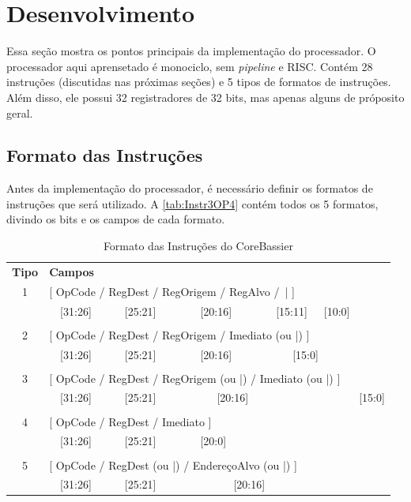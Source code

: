 \documentclass[
	12pt,
	openright,
	a4paper,
	english,			
	french,				
	spanish,			
	brazil,				
	]{abntex2}
\begin{document}
\chapter{Desenvolvimento}
Essa seção mostra os pontos principais da implementação do processador. O processador aqui aprensetado é monociclo, sem \textit{pipeline} e RISC. Contém 28 instruções (discutidas nas próximas seções) e 5 tipos de formatos de instruções.\\
Além disso, ele possui 32 registradores de 32 bits, mas apenas alguns de próposito geral.

\section{Formato das Instruções}
Antes da implementação do processador, é necessário definir os formatos de instruções que será utilizado. A \autoref{tab:Instr3OP4} contém todos os 5 formatos, divindo os bits e os campos de cada formato.
\begin{table}[htb]
\centering
\ABNTEXfontereduzida
\caption{Formato das Instruções do CoreBassier} \label{tab:Instr3OP4}
\begin{tabular}{cl} 
	\textbf{Tipo} & \textbf{Campos}\\
	1 & [ OpCode / RegDest / RegOrigem / RegAlvo /\ | ]\\
	  &  \ \ [31:26]\ \ \ \ \ \ [25:21]\ \ \ \ \ \ \ \ [20:16]\ \ \ \ \ \ \ \ [15:11]\ \ \ [10:0]\\
	\hline
	\\
	2 & [ OpCode / RegDest / RegOrigem / Imediato (ou |) ]\\
	  &  \ \ [31:26]\ \ \ \ \ \ [25:21]\ \ \ \ \ \ \ \ [20:16]\ \ \ \ \ \ \ \ \ \ \ [15:0]\\
	\hline
	\\
	3 & [ OpCode / RegDest / RegOrigem (ou |) / Imediato (ou |) ]\\
	  &  \ \ [31:26]\ \ \ \ \ \ [25:21]\ \ \ \ \ \ \ \ \ \ \ [20:16]\ \ \ \ \ \ \ \ \ \ \ \ \ \ \ \ \ \ \ \ [15:0]\\
	\hline
	\\
	4 & [ OpCode / RegDest / Imediato ]\\
	  &  \ \ [31:26]\ \ \ \ \ \ [25:21]\ \ \ \ \ \ \ \ [20:0]\\
	\hline
	\\
	5 & [ OpCode / RegDest (ou |) / EndereçoAlvo (ou |) ]\\
	  &  \ \ [31:26]\ \ \ \ \ \ [25:21]\ \ \ \ \ \ \ \ \ \ \ \ \ \ [20:16]\\
	\hline
\end{tabular}
\end{table}
  
\end{document}
